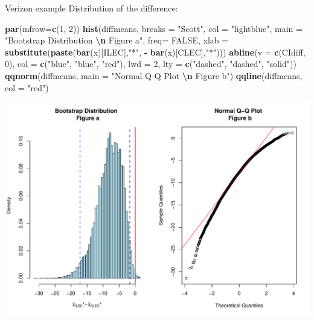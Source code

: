 \documentclass[
  ignorenonframetext,
]{beamer}
\newenvironment{Shaded}{\begin{snugshade}}{\end{snugshade}}
\newcommand{\AttributeTok}[1]{\textcolor[rgb]{0.13,0.29,0.53}{#1}}
\newcommand{\ConstantTok}[1]{\textcolor[rgb]{0.56,0.35,0.01}{#1}}
\newcommand{\DecValTok}[1]{\textcolor[rgb]{0.00,0.00,0.81}{#1}}
\newcommand{\FunctionTok}[1]{\textcolor[rgb]{0.13,0.29,0.53}{\textbf{#1}}}
\newcommand{\NormalTok}[1]{#1}
\newcommand{\SpecialCharTok}[1]{\textcolor[rgb]{0.81,0.36,0.00}{\textbf{#1}}}
\newcommand{\StringTok}[1]{\textcolor[rgb]{0.31,0.60,0.02}{#1}}
\begin{document}
\begin{frame}[fragile]{Verizon example}
\protect\hypertarget{verizon-example-7}{}
Distribution of the difference:

\tiny

\begin{Shaded}
\begin{Highlighting}[]
\FunctionTok{par}\NormalTok{(}\AttributeTok{mfrow=}\FunctionTok{c}\NormalTok{(}\DecValTok{1}\NormalTok{, }\DecValTok{2}\NormalTok{))}
\FunctionTok{hist}\NormalTok{(diffmeans, }\AttributeTok{breaks =} \StringTok{"Scott"}\NormalTok{, }\AttributeTok{col =} \StringTok{"lightblue"}\NormalTok{, }
     \AttributeTok{main =} \StringTok{"Bootstrap Distribution }\SpecialCharTok{\textbackslash{}n}\StringTok{ Figure a"}\NormalTok{, }
     \AttributeTok{freq=} \ConstantTok{FALSE}\NormalTok{, }\AttributeTok{xlab =} \FunctionTok{substitute}\NormalTok{(}\FunctionTok{paste}\NormalTok{(}\FunctionTok{bar}\NormalTok{(x)[ILEC],}\StringTok{"*"}\NormalTok{, }\SpecialCharTok{{-}} \FunctionTok{bar}\NormalTok{(x)[CLEC],}\StringTok{"*"}\NormalTok{)))}
\FunctionTok{abline}\NormalTok{(}\AttributeTok{v =} \FunctionTok{c}\NormalTok{(CIdiff, }\DecValTok{0}\NormalTok{), }\AttributeTok{col =} \FunctionTok{c}\NormalTok{(}\StringTok{"blue"}\NormalTok{, }\StringTok{"blue"}\NormalTok{, }\StringTok{"red"}\NormalTok{), }\AttributeTok{lwd =} \DecValTok{2}\NormalTok{, }
       \AttributeTok{lty =} \FunctionTok{c}\NormalTok{(}\StringTok{"dashed"}\NormalTok{, }\StringTok{"dashed"}\NormalTok{, }\StringTok{"solid"}\NormalTok{))}
\FunctionTok{qqnorm}\NormalTok{(diffmeans, }\AttributeTok{main =} \StringTok{"Normal Q{-}Q Plot }\SpecialCharTok{\textbackslash{}n}\StringTok{ Figure b"}\NormalTok{)}
\FunctionTok{qqline}\NormalTok{(diffmeans, }\AttributeTok{col =} \StringTok{"red"}\NormalTok{)}
\end{Highlighting}
\end{Shaded}

\begin{center}\includegraphics[width=0.6\linewidth,height=0.4\textheight]{Week10A_files/figure-beamer/unnamed-chunk-38-1} \end{center}


\end{frame}
\end{document}
